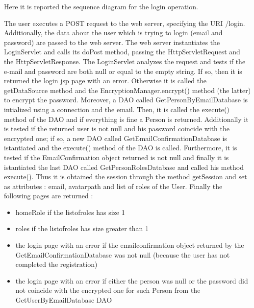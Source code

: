 \begin{flushleft}
Here it is reported the sequence diagram for the login operation. 

The user executes a POST request to the web server, specifying the URI /login. Additionally, the data about the user which is trying to login (email and password) are passed to the web server. The web server instantiates the LoginServlet and calls its doPost method, passing the HttpServletRequest and the HttpServletResponse. The LoginServlet analyzes the request and tests if the e-mail and password are both null or equal to the empty string. If so, then it is returned the login jsp page with an error. Otherwise it is called the getDataSource method and the EncryptionManager.encrypt() method (the latter) to encrypt the password. Moreover, a DAO called GetPersonByEmailDatabase is intialized using a connection and the email. Then, it is called the execute() method of the DAO and if everything is fine a Person is returned. Additionally it is tested if the returned user is not null and his password coincide with the encrypted one; if so, a new DAO called GetEmailConfirmationDatabase is istantiated and the execute() method of the DAO is called. Furthermore, it is tested if the EmailConfirmation object returned is not null and finally it is istantiated the last DAO called GetPersonRolesDatabase and called his method execute().
Thus it is obtained the session through the method getSession and set as attributes : email, avatarpath and list of roles of the User.
Finally the following pages are returned :
\begin{itemize}
	\item homeRole if the listofroles has size 1
	\item roles if the listofroles has size greater than 1
	\item the login page with an error if the emailconfirmation object returned by the GetEmailConfirmationDatabase was not null (because the user has not completed the registration) 
	\item the login page with an error if either the person was null or the password did not coincide with the encrypted one for such Person from the GetUserByEmailDatabase DAO
\end{itemize}

\end{flushleft}



